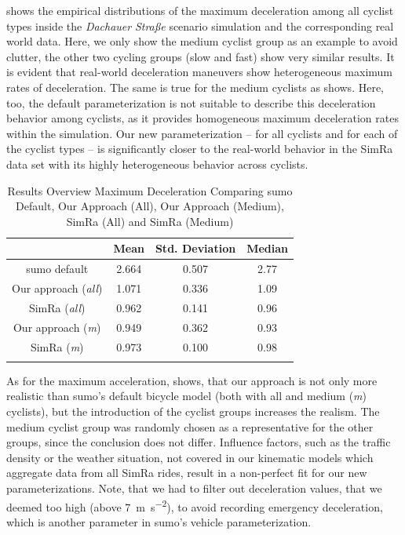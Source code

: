  shows the empirical distributions of the maximum deceleration among all cyclist types inside the \textit{Dachauer} \textit{Straße} scenario simulation and the corresponding real world data.
Here, we only show the medium cyclist group as an example to avoid clutter, the other two cycling groups (slow and fast) show very similar results.
It is evident that real-world deceleration maneuvers show heterogeneous maximum rates of deceleration.
The same is true for the medium cyclists as  shows.
Here, too, the default parameterization is not suitable to describe this deceleration behavior among cyclists, as it provides homogeneous maximum deceleration rates within the simulation.
Our new parameterization -- for all cyclists and for each of the cyclist types -- is significantly closer to the real-world behavior in the SimRa data set with its highly heterogeneous behavior across cyclists.
\begin{table}
\centering
\caption{Results Overview Maximum Deceleration Comparing \ac{sumo} Default, Our Approach (All), Our Approach (Medium), SimRa (All) and SimRa (Medium)}%
\label{tab:results_overview_dec}
\begin{tabular}{cccc}
\toprule
& Mean & Std. Deviation & Median\\
\midrule
\midrule
\ac{sumo} default & \num{2.664} & \num{0.507} & \num{2.77} \\
\midrule
Our approach (\textit{all}) & \num{1.071} & \num{0.336} & \num{1.09} \\
SimRa (\textit{all}) & \num{0.962} & \num{0.141} & \num{0.96} \\
\midrule
Our approach (\textit{m}) & \num{0.949} & \num{0.362} & \num{0.93} \\
SimRa (\textit{m}) & \num{0.973} & \num{0.100} & \num{0.98} \\
\bottomrule&
\end{tabular}
\end{table}
As for the maximum acceleration,  shows, that our approach is not only more realistic than \ac{sumo}'s default bicycle model (both with all and medium (\textit{m}) cyclists), but the introduction of the cyclist groups increases the realism.
The medium cyclist group was randomly chosen as a representative for the other groups, since the conclusion does not differ.
Influence factors, such as the traffic density or the weather situation, not covered in our kinematic models which aggregate data from all SimRa rides, result in a non-perfect fit for our new parameterizations.
Note, that we had to filter out deceleration values, that we deemed too high (above \SI{7}{\m\per\s\squared}), to avoid recording emergency deceleration, which is another parameter in \ac{sumo}'s vehicle parameterization.


